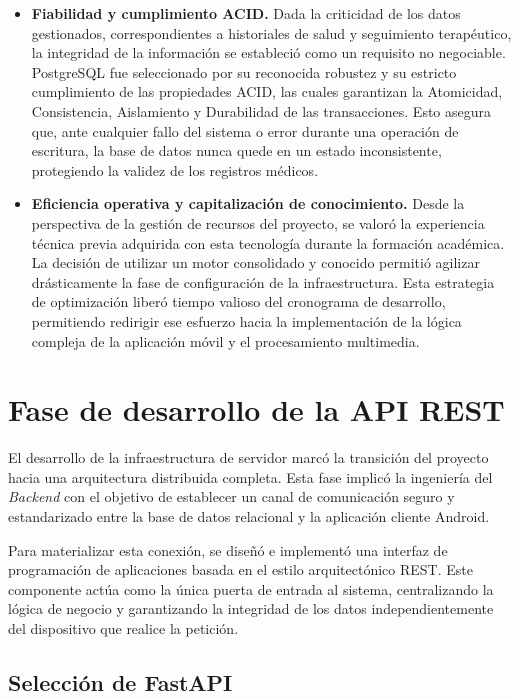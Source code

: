 \begin{itemize}
    \item \textbf{Fiabilidad y cumplimiento ACID.} Dada la criticidad de los datos gestionados, correspondientes a historiales de salud y seguimiento terapéutico, la integridad de la información se estableció como un requisito no negociable. PostgreSQL fue seleccionado por su reconocida robustez y su estricto cumplimiento de las propiedades ACID, las cuales garantizan la Atomicidad, Consistencia, Aislamiento y Durabilidad de las transacciones. Esto asegura que, ante cualquier fallo del sistema o error durante una operación de escritura, la base de datos nunca quede en un estado inconsistente, protegiendo la validez de los registros médicos.
    \item \textbf{Eficiencia operativa y capitalización de conocimiento.} Desde la perspectiva de la gestión de recursos del proyecto, se valoró la experiencia técnica previa adquirida con esta tecnología durante la formación académica. La decisión de utilizar un motor consolidado y conocido permitió agilizar drásticamente la fase de configuración de la infraestructura. Esta estrategia de optimización liberó tiempo valioso del cronograma de desarrollo, permitiendo redirigir ese esfuerzo hacia la implementación de la lógica compleja de la aplicación móvil y el procesamiento multimedia.
\end{itemize}

\section{Fase de desarrollo de la API REST}

El desarrollo de la infraestructura de servidor marcó la transición del proyecto hacia una arquitectura distribuida completa. Esta fase implicó la ingeniería del \textit{Backend} con el objetivo de establecer un canal de comunicación seguro y estandarizado entre la base de datos relacional y la aplicación cliente Android.

Para materializar esta conexión, se diseñó e implementó una interfaz de programación de aplicaciones basada en el estilo arquitectónico REST. Este componente actúa como la única puerta de entrada al sistema, centralizando la lógica de negocio y garantizando la integridad de los datos independientemente del dispositivo que realice la petición.

\subsection{Selección de FastAPI}

